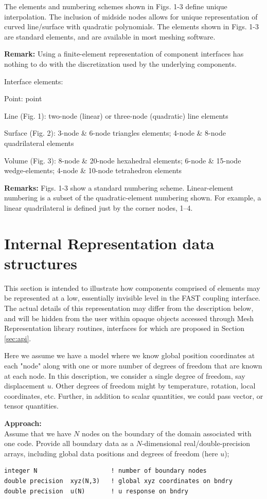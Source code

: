 \documentclass[11pt]{article}
\begin{document}
The elements and numbering schemes shown in Figs. 1-3 define unique
interpolation.  The inclusion of midside nodes allows for unique
representation of curved line/surface with quadratic polynomials.  The
elements shown in Figs. 1-3 are standard elements, and are available in most
meshing software.


\textbf{Remark:} Using a finite-element representation of component
interfaces has nothing to do with the discretization used by the underlying
components.

Interface elements:

Point: point

Line (Fig. 1): two-node (linear) or three-node (quadratic) line elements

Surface (Fig. 2): 3-node \& 6-node triangles elements; 4-node \& 8-node 
quadrilateral elements

Volume (Fig. 3): 8-node \& 20-node hexahedral elements;  
6-node \& 15-node wedge-elements;
4-node \& 10-node tetrahedron elements

\textbf{Remarks:} Figs. 1-3 show a standard numbering scheme. Linear-element 
numbering is a subset of the quadratic-element numbering shown.  For
example, a linear quadrilateral is defined just by the corner nodes, 1--4.

\section{Internal Representation data structures}
\label{sec:internal}

This section is intended to illustrate how components comprised of elements may be represented
at a low, essentially invisible level in the FAST coupling interface. The actual details of this
representation may differ from the description below, and will be hidden from the user 
within opaque objects accessed through 
Mesh Representation library routines, interfaces for which are proposed in 
Section \ref{sec:api}.

Here we assume we have a model where we know global position coordinates at
each "node" along with one or more number of degrees of freedom that are
known at each node.   In this description, we consider a single degree of
freedom, say displacement $u$.  Other degrees of freedom might by
temperature, rotation, local coordinates, etc.  Further, in addition to
scalar quantities, we could pass  vector, or tensor quantities.

\textbf{Approach:}\\
Assume that we have $N$ nodes on the boundary of the domain associated with
one code.  
Provide all boundary data as a $N$-dimensional real/double-precision arrays,
including global data positions and degrees of freedom (here $u$); 
\begin{verbatim}
integer N                    ! number of boundary nodes
double precision  xyz(N,3)   ! global xyz coordinates on bndry
double precision  u(N)       ! u response on bndry
\end{verbatim}
\end{document}
